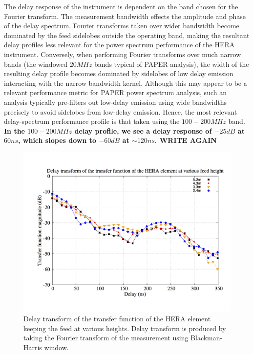 \documentclass[iop]{emulateapj}
\begin{document}
The delay response of the instrument is dependent on the band chosen for the Fourier transform.
The measurement bandwidth effects the amplitude and phase of the delay spectrum. Fourier transforms taken over wider bandwidth
become dominated by the feed sidelobes outside the operating band, making the resultant delay profiles less relevant
for the power spectrum performance of the HERA instrument.  Conversely, when performing Fourier transforms over much 
narrow bands (the windowed $20MHz$ bands typical of PAPER analysis), the width of the resulting delay profile
becomes dominated by sidelobes of low delay emission interacting with the narrow bandwidth kernel.  
Although this may appear to be a relevant performance metric for PAPER power spectrum analysis, such an analysis typically pre-filters out low-delay emission using wide bandwidths precisely to avoid sidelobes from low-delay emission.  Hence, the most relevant delay-spectrum performance profile is that taken using the $100-200MHz$ band. \textbf{In the $100-200MHz$ delay profile, we see a delay response of $-25dB$ at $60ns$, which slopes down to $-60dB$ at $\sim120ns$.  WRITE AGAIN}
\begin{figure}
\centering
\includegraphics[width=\linewidth]{plots1/delayspectrum_height.png}
\caption{Delay transform of the transfer function of the HERA element keeping the feed at various heights. Delay transform is produced by taking the Fourier transform of the measurement using Blackman-Harris window.}
\label{fig:elevator}
\end{figure}
\end{document}
